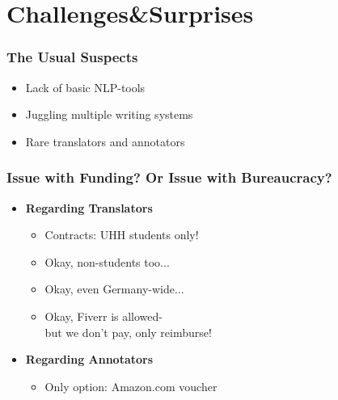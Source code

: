 \documentclass[aspectratio=169]{beamer}
\begin{document}
\section{Challenges\&Surprises}

\begin{frame}[fragile]
	\frametitle{The Usual Suspects}
    \begin{itemize}
        \item Lack of basic NLP-tools
        \item Juggling multiple writing systems
        \item Rare translators and annotators
    \end{itemize}
\end{frame}


\begin{frame}[fragile]
	\frametitle{Issue with Funding? Or Issue with Bureaucracy?}
    \begin{minipage}{.50\textwidth}
        \centering
        \begin{itemize}
            \item \textbf{Regarding Translators}
            \begin{itemize}
                \item Contracts: UHH students only!
                \item Okay, non-students too...
                \item Okay, even Germany-wide...
                \item Okay, Fiverr is allowed- \\ but we don't pay, only reimburse!
            \end{itemize}
            \item \textbf{Regarding Annotators}
            \begin{itemize}
                \item Only option: Amazon.com voucher
            \end{itemize}
        \end{itemize}
    \end{minipage}%
    \begin{minipage}{.50\textwidth}
    \centering
        \begin{figure}

\end{figure}
\end{minipage}
\end{frame}
\end{document}
